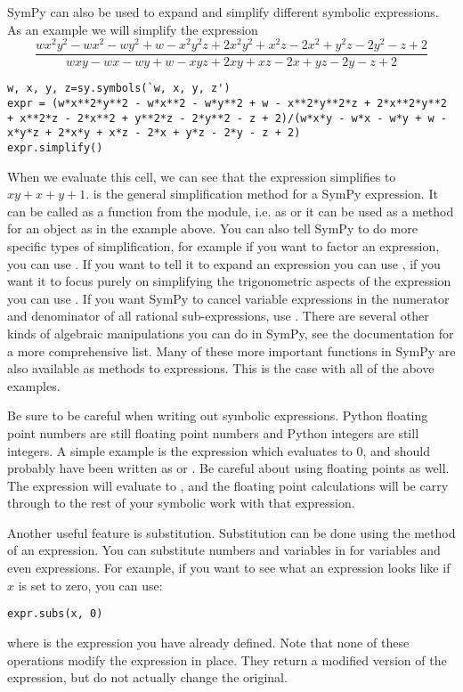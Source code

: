 SymPy can also be used to expand and simplify different symbolic expressions.
As an example we will simplify the expression
\begin{equation*}
\frac{w x^2 y^2 - w x^2 - w y^2 + w - x^2 y^2 z + 2 x^2 y^2 + x^2 z - 2 x^2 + y^2 z - 2 y^2 - z + 2}{w x y - w x - w y + w - x y z + 2 x y + x z - 2 x + y z - 2 y - z + 2}
\end{equation*}
\begin{lstlisting}
w, x, y, z=sy.symbols(`w, x, y, z')
expr = (w*x**2*y**2 - w*x**2 - w*y**2 + w - x**2*y**2*z + 2*x**2*y**2 + x**2*z - 2*x**2 + y**2*z - 2*y**2 - z + 2)/(w*x*y - w*x - w*y + w - x*y*z + 2*x*y + x*z - 2*x + y*z - 2*y - z + 2)
expr.simplify()
\end{lstlisting}
When we evaluate this cell, we can see that the expression simplifies to $x y + x + y +1$.
 is the general simplification method for a SymPy expression.
It can be called as a function from the module, i.e. as  or it can be used as a method for an object as in the example above.
You can also tell SymPy to do more specific types of simplification, for example if you want to factor an expression, you can use .
If you want to tell it to expand an expression you can use , if you want it to focus purely on simplifying the trigonometric aspects of the expression you can use .
If you want SymPy to cancel variable expressions in the numerator and denominator of all rational sub-expressions, use .
There are several other kinds of algebraic manipulations you can do in SymPy, see the documentation for a more comprehensive list.
Many of these more important functions in SymPy are also available as methods to expressions.
This is the case with all of the above examples.

Be sure to be careful when writing out symbolic expressions.
Python floating point numbers are still floating point numbers and Python integers are still integers.
A simple example is the expression  which evaluates to 0, and should probably have been written as  or .
Be careful about using floating points as well.
The expression  will evaluate to , and the floating point calculations will be carry through to the rest of your symbolic work with that expression.

Another useful feature is substitution.
Substitution can be done using the  method of an expression.
You can substitute numbers and variables in for variables and even expressions.
For example, if you want to see what an expression looks like if $x$ is set to zero, you can use:
\begin{lstlisting}
expr.subs(x, 0)
\end{lstlisting}
where  is the expression you have already defined.
Note that none of these operations modify the expression in place.
They return a modified version of the expression, but do not actually change the original.


